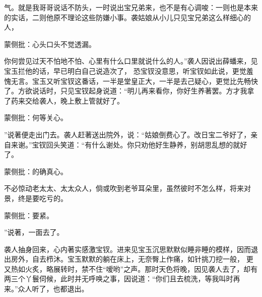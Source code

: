 \begin{parag}
气。就是我哥哥说话不防头，一时说出宝兄弟来，也不是有心调唆：一则也是本来的实话，二则他原不理论这些防嫌小事。袭姑娘从小儿只见宝兄弟这么样细心的人，\begin{note}蒙侧批：心头口头不觉透漏。\end{note}你何尝见过天不怕地不怕、心里有什么口里就说什么的人。”袭人因说出薛蟠来，见宝玉拦他的话，早已明白自己说造次了， 恐宝钗没意思，听宝钗如此说，更觉羞愧无言。宝玉又听宝钗这番话，一半是堂皇正大，一半是去己疑心，更觉比先畅快了。方欲说话时，只见宝钗起身说道：“明儿再来看你，你好生养著罢。方才我拿了药来交给袭人，晚上敷上管就好了。\begin{note}蒙侧批：何等关心。\end{note}”说著便走出门去。袭人赶著送出院外，说：“姑娘倒费心了。改日宝二爷好了，亲自来谢。”宝钗回头笑道：“有什么谢处。你只劝他好生静养，别胡思乱想的就好了。\begin{note}蒙侧批：的确真心。\end{note}不必惊动老太太、太太众人，倘或吹到老爷耳朵里，虽然彼时不怎么样，将来对景，终是要吃亏的。\begin{note}蒙侧批：要紧。\end{note}”说著，一面去了。
\end{parag}


\begin{parag}
    袭人抽身回来，心内著实感激宝钗。进来见宝玉沉思默默似睡非睡的模样，因而退出房外，自去栉沐。宝玉默默的躺在床上，无奈臀上作痛，如针挑刀挖一般， 更又热如火炙，略展转时，禁不住“嗳哟”之声。那时天色将晚，因见袭人去了，却有两三个丫鬟伺候，此时并无呼唤之事，因说道：“你们且去梳洗，等我叫时再来。”众人听了，也都退出。
\end{parag}



